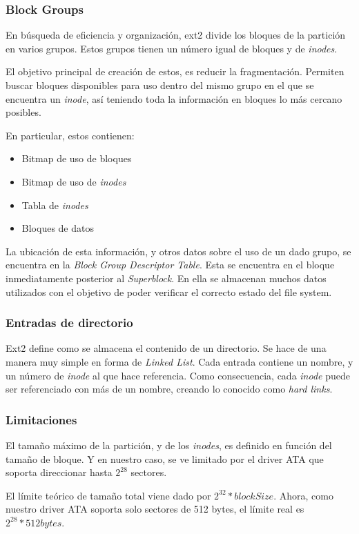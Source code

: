 \documentclass[a4paper,10pt]{article}
\begin{document}
\subsubsection{Block Groups}
En búsqueda de eficiencia y organización, ext2 divide los bloques de la partición en varios grupos.
Estos grupos tienen un número igual de bloques y de \textit{inodes}.

El objetivo principal de creación de estos, es reducir la fragmentación. 
Permiten buscar bloques disponibles para uso dentro del mismo grupo en el que se encuentra un \textit{inode}, así teniendo toda la información en bloques 
lo más cercano posibles.

En particular, estos contienen:
\begin{itemize}
\item Bitmap de uso de bloques
\item Bitmap de uso de \textit{inodes}
\item Tabla de \textit{inodes}
\item Bloques de datos
\end{itemize}

La ubicación de esta información, y otros datos sobre el uso de un dado grupo, se encuentra en la \textit{Block Group Descriptor Table}.
Esta se encuentra en el bloque inmediatamente posterior al \textit{Superblock}.
En ella se almacenan muchos datos utilizados con el objetivo de poder verificar el correcto estado del file system.

\subsubsection{Entradas de directorio}
Ext2 define como se almacena el contenido de un directorio.
Se hace de una manera muy simple en forma de \textit{Linked List}.
Cada entrada contiene un nombre, y un número de \textit{inode} al que hace referencia.
Como consecuencia, cada \textit{inode} puede ser referenciado con más de un nombre, creando lo conocido como \textit{hard links}.

\subsubsection{Limitaciones}
El tamaño máximo de la partición, y de los \textit{inodes}, es definido en función del tamaño de bloque.
Y en nuestro caso, se ve limitado por el driver ATA que soporta direccionar hasta $ 2^{28} $ sectores.

El límite teórico de tamaño total viene dado por $ 2^{32} * blockSize $.
Ahora, como nuestro driver ATA soporta solo sectores de 512 bytes, el límite real es $ 2^{28} * 512 bytes $.
\end{document}
